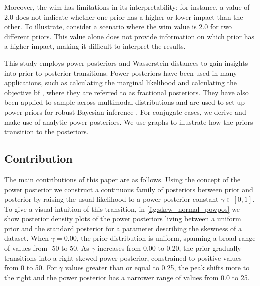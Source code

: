 \documentclass[12pt]{article}
\begin{document}
Moreover, the \gls{wim} has limitations in its interpretability; for instance, a value of 2.0 does not indicate whether one prior has a higher or lower impact than the other. To illustrate, consider a scenario where the \gls{wim} value is 2.0 for two different priors. This value alone does not provide information on which prior has a higher impact, making it difficult to interpret the results.

This study employs power posteriors and Wasserstein distances to gain insights into prior to posterior transitions. Power posteriors have been used in many applications, such as calculating the marginal  likelihood \citep{friel2008marginal} and calculating the objective \gls{bf} \citep{ohaganPropertiesIntrinsicFractional1997}, where they are referred to as fractional posteriors. They have also been applied to sample across multimodal distributions and are used to set up power priors \citep{Dimitris_2015, Joseph_2000} for robust Bayesian inference  \citep{Jeffrey_2019}. For conjugate cases, we derive and make use of analytic power posteriors. We use graphs to illustrate how the priors transition to the posteriors.
\subsection{Contribution}
The main contributions of this paper are as follows. Using the concept of the power posterior we construct a continuous family of posteriors between prior and posterior by raising the usual likelihood to a power posterior constant $\gamma \in [0, 1]$. To give a visual intuition of this transition, in \cref{fig:skew_normal_powpos} we show posterior density plots of the power posteriors living between a uniform prior and the standard posterior for a parameter describing the skewness of a dataset. When $\gamma = 0.00$, the prior distribution is uniform, spanning a broad range of values from -50 to 50. As $\gamma$ increases from 0.00 to 0.20, the prior gradually transitions into a right-skewed power posterior, constrained to positive values from 0 to 50. For $\gamma$ values greater than or equal to 0.25, the peak shifts more to the right and the power posterior has a narrower range of values from 0.0 to 25. 
\end{document}
